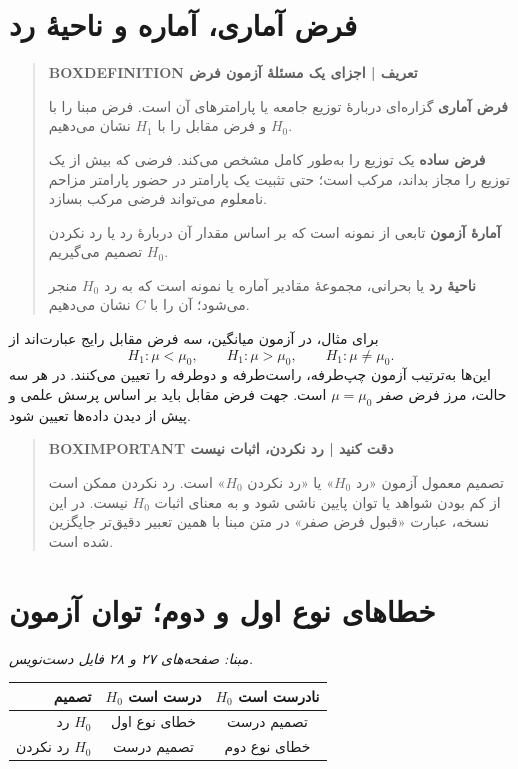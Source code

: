 \section{فرض آماری، آماره و ناحیهٔ رد}
\begin{quote}\textbf{BOXDEFINITION تعریف | اجزای یک مسئلهٔ آزمون فرض}\par 
\textbf{فرض آماری} گزاره‌ای دربارهٔ توزیع جامعه یا پارامترهای آن است. فرض مبنا را با $H_0$ و فرض مقابل را با $H_1$ نشان می‌دهیم.

\textbf{فرض ساده} یک توزیع را به‌طور کامل مشخص می‌کند. فرضی که بیش از یک توزیع را مجاز بداند، مرکب است؛ حتی تثبیت یک پارامتر در حضور پارامتر مزاحم نامعلوم می‌تواند فرضی مرکب بسازد.

\textbf{آمارهٔ آزمون} تابعی از نمونه است که بر اساس مقدار آن دربارهٔ رد یا رد نکردن $H_0$ تصمیم می‌گیریم.

\textbf{ناحیهٔ رد} یا بحرانی، مجموعهٔ مقادیر آماره یا نمونه است که به رد $H_0$ منجر می‌شود؛ آن را با $C$ نشان می‌دهیم.
\end{quote}
برای مثال، در آزمون میانگین، سه فرض مقابل رایج عبارت‌اند از
\[
H_1:\mu<\mu_0,\qquad H_1:\mu>\mu_0,\qquad H_1:\mu\ne\mu_0.
\]
این‌ها به‌ترتیب آزمون چپ‌طرفه، راست‌طرفه و دوطرفه را تعیین می‌کنند. در هر سه حالت، مرز فرض صفر $\mu=\mu_0$ است. جهت فرض مقابل باید بر اساس پرسش علمی و پیش از دیدن داده‌ها تعیین شود.
\begin{quote}\textbf{BOXIMPORTANT دقت کنید | رد نکردن، اثبات نیست}\par 
تصمیم معمول آزمون «رد $H_0$» یا «رد نکردن $H_0$» است. رد نکردن ممکن است از کم بودن شواهد یا توان پایین ناشی شود و به معنای اثبات $H_0$ نیست. در این نسخه، عبارت «قبول فرض صفر» در متن مبنا با همین تعبیر دقیق‌تر جایگزین شده است.
\end{quote}
\section{خطاهای نوع اول و دوم؛ توان آزمون}
\textit{مبنا: صفحه‌های ۲۷ و ۲۸ فایل دست‌نویس.}\par 

\begin{tabular}{r|cc}
\toprule
تصمیم & $H_0$ درست است & $H_0$ نادرست است\\
\midrule
رد $H_0$ & خطای نوع اول & تصمیم درست\\
رد نکردن $H_0$ & تصمیم درست & خطای نوع دوم\\
\bottomrule
\end{tabular}

